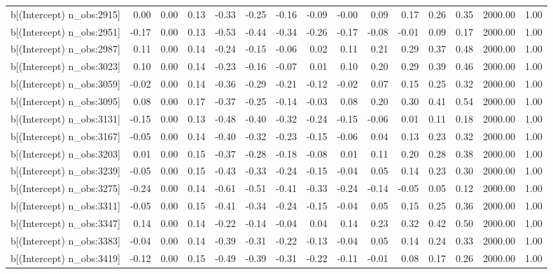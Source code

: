 \begin{table}[ht]
\begin{tabular}{rrrrrrrrrrrrrrr}
  b[(Intercept) n\_obs:2915] & 0.00 & 0.00 & 0.13 & -0.33 & -0.25 & -0.16 & -0.09 & -0.00 & 0.09 & 0.17 & 0.26 & 0.35 & 2000.00 & 1.00 \\ 
  b[(Intercept) n\_obs:2951] & -0.17 & 0.00 & 0.13 & -0.53 & -0.44 & -0.34 & -0.26 & -0.17 & -0.08 & -0.01 & 0.09 & 0.17 & 2000.00 & 1.00 \\ 
  b[(Intercept) n\_obs:2987] & 0.11 & 0.00 & 0.14 & -0.24 & -0.15 & -0.06 & 0.02 & 0.11 & 0.21 & 0.29 & 0.37 & 0.48 & 2000.00 & 1.00 \\ 
  b[(Intercept) n\_obs:3023] & 0.10 & 0.00 & 0.14 & -0.23 & -0.16 & -0.07 & 0.01 & 0.10 & 0.20 & 0.29 & 0.39 & 0.46 & 2000.00 & 1.00 \\ 
  b[(Intercept) n\_obs:3059] & -0.02 & 0.00 & 0.14 & -0.36 & -0.29 & -0.21 & -0.12 & -0.02 & 0.07 & 0.15 & 0.25 & 0.32 & 2000.00 & 1.00 \\ 
  b[(Intercept) n\_obs:3095] & 0.08 & 0.00 & 0.17 & -0.37 & -0.25 & -0.14 & -0.03 & 0.08 & 0.20 & 0.30 & 0.41 & 0.54 & 2000.00 & 1.00 \\ 
  b[(Intercept) n\_obs:3131] & -0.15 & 0.00 & 0.13 & -0.48 & -0.40 & -0.32 & -0.24 & -0.15 & -0.06 & 0.01 & 0.11 & 0.18 & 2000.00 & 1.00 \\ 
  b[(Intercept) n\_obs:3167] & -0.05 & 0.00 & 0.14 & -0.40 & -0.32 & -0.23 & -0.15 & -0.06 & 0.04 & 0.13 & 0.23 & 0.32 & 2000.00 & 1.00 \\ 
  b[(Intercept) n\_obs:3203] & 0.01 & 0.00 & 0.15 & -0.37 & -0.28 & -0.18 & -0.08 & 0.01 & 0.11 & 0.20 & 0.28 & 0.38 & 2000.00 & 1.00 \\ 
  b[(Intercept) n\_obs:3239] & -0.05 & 0.00 & 0.15 & -0.43 & -0.33 & -0.24 & -0.15 & -0.04 & 0.05 & 0.14 & 0.23 & 0.30 & 2000.00 & 1.00 \\ 
  b[(Intercept) n\_obs:3275] & -0.24 & 0.00 & 0.14 & -0.61 & -0.51 & -0.41 & -0.33 & -0.24 & -0.14 & -0.05 & 0.05 & 0.12 & 2000.00 & 1.00 \\ 
  b[(Intercept) n\_obs:3311] & -0.05 & 0.00 & 0.15 & -0.41 & -0.34 & -0.24 & -0.15 & -0.04 & 0.05 & 0.15 & 0.25 & 0.36 & 2000.00 & 1.00 \\ 
  b[(Intercept) n\_obs:3347] & 0.14 & 0.00 & 0.14 & -0.22 & -0.14 & -0.04 & 0.04 & 0.14 & 0.23 & 0.32 & 0.42 & 0.50 & 2000.00 & 1.00 \\ 
  b[(Intercept) n\_obs:3383] & -0.04 & 0.00 & 0.14 & -0.39 & -0.31 & -0.22 & -0.13 & -0.04 & 0.05 & 0.14 & 0.24 & 0.33 & 2000.00 & 1.00 \\ 
  b[(Intercept) n\_obs:3419] & -0.12 & 0.00 & 0.15 & -0.49 & -0.39 & -0.31 & -0.22 & -0.11 & -0.01 & 0.08 & 0.17 & 0.26 & 2000.00 & 1.00 \\ 

\end{tabular}
\end{table}
